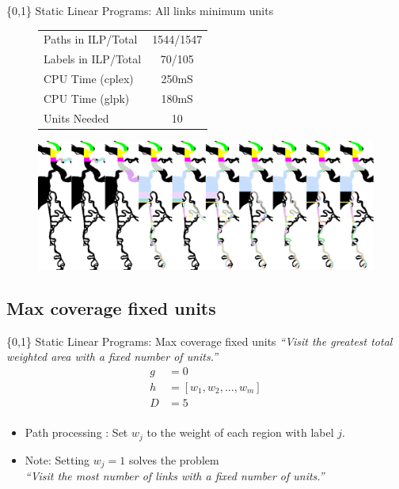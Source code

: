 \documentclass[xcolor=pdflatex,dvipsnames,table]{beamer}
\begin{document}
\begin{frame}{\{0,1\} Static Linear Programs: All links minimum units}
\begin{figure}
  \begin{tabular}{|l|c|}
  \hline 
  Paths in ILP/Total & 1544/1547 \\
  Labels in ILP/Total & 70/105 \\
  CPU Time (cplex) & 250mS\\
  CPU Time (glpk) & 180mS \\
  Units Needed & 10 \\
  \hline
  \end{tabular}
\end{figure}

  \begin{figure}
     {\includegraphics[width=1\textwidth]{figures/all_links_minimum_units_paths.png}}
  \end{figure}
\end{frame}


\subsection{Max coverage fixed units}
\begin{frame}{\{0,1\} Static Linear Programs: Max coverage fixed units}
\emph{``Visit the greatest total weighted area with a fixed number of units.''}
\begin{align*}
g &= 0\\
h &= \left[ w_1,w_2, \dots ,w_m\right]\\
D &= 5\\
\end{align*}

\begin{itemize}
 \item Path processing : Set $w_j$ to the weight of each region with label $j$.
 \item Note: Setting $w_j=1$ solves the problem\\ \emph{``Visit the most number of links with a fixed number of units.''}
\end{itemize}
\end{frame}
\end{document}
